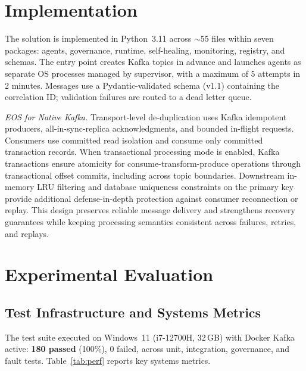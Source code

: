 \documentclass[conference]{IEEEtran}
\begin{document}
\section{Implementation}
\label{sec:implementation}

The solution is implemented in Python~3.11 across $\sim$55 files within seven packages: agents, governance, runtime, self-healing, monitoring, registry, and schemas. The entry point creates Kafka topics in advance and launches agents as separate OS processes managed by supervisor, with a maximum of 5 attempts in 2 minutes. Messages use a Pydantic-validated schema (v1.1) containing the correlation ID; validation failures are routed to a dead letter queue.

\noindent\textit{EOS for Native Kafka.} Transport-level de-duplication uses Kafka idempotent producers, all-in-sync-replica acknowledgments, and bounded in-flight requests. Consumers use committed read isolation and consume only committed transaction records. When transactional processing mode is enabled, Kafka transactions ensure atomicity for consume-transform-produce operations through transactional offset commits, including across topic boundaries. Downstream in-memory LRU filtering and database uniqueness constraints on the primary key provide additional defense-in-depth protection against consumer reconnection or replay. This design preserves reliable message delivery and strengthens recovery guarantees while keeping processing semantics consistent across failures, retries, and replays.

\section{Experimental Evaluation}
\label{sec:eval}

\subsection{Test Infrastructure and Systems Metrics}

The test suite executed on Windows~11 (i7-12700H, 32\,GB) with Docker Kafka active: \textbf{180 passed} (100\%), 0 failed, across unit, integration, governance, and fault tests. Table~\ref{tab:perf} reports key systems metrics.
\end{document}
